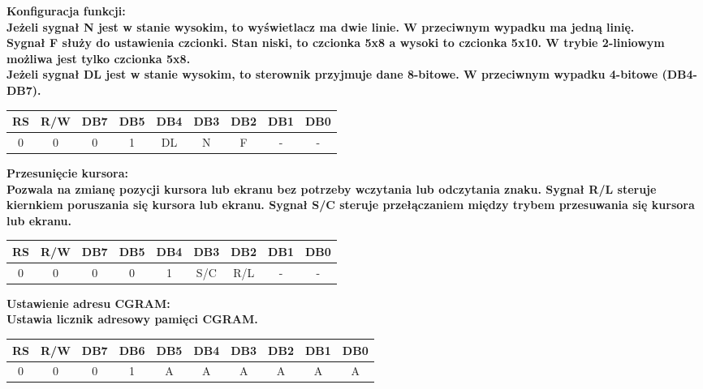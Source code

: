 \documentclass[a4paper,12pt]{article}
\newcommand{\h}[1]{\noindent \bf #1 \rm \\ \noindent}
\begin{document}
\h{Konfiguracja funkcji:}
Jeżeli sygnał N jest w stanie wysokim, to wyświetlacz ma dwie linie. W przeciwnym wypadku ma jedną linię.\\

\noindent
Sygnał F służy do ustawienia czcionki. Stan niski, to czcionka 5x8 a wysoki to czcionka 5x10. W trybie 2-liniowym możliwa jest tylko czcionka 5x8.\\

\noindent
Jeżeli sygnał DL jest w stanie wysokim, to sterownik przyjmuje dane 8-bitowe. W przeciwnym wypadku 4-bitowe (DB4-DB7).
\begin{table}[H]
	\centering
	\begin{tabular}{|c|c|c|c|c|c|c|c|c|}
		\hline
		\textbf{RS} & \textbf{R/W} & \textbf{DB7} & \textbf{DB5} & \textbf{DB4} & \textbf{DB3} & \textbf{DB2} & \textbf{DB1} & \textbf{DB0} \\ \hline
		0           & 0            & 0            & 1            & DL           & N            & F            & -            & -            \\ \hline
	\end{tabular}
\end{table}

\newpage
\h{Przesunięcie kursora:}
Pozwala na zmianę pozycji kursora lub ekranu bez potrzeby wczytania lub odczytania znaku. Sygnał R/L steruje kiernkiem poruszania się kursora lub ekranu. Sygnał S/C steruje przełączaniem między trybem przesuwania się kursora lub ekranu. 
\begin{table}[H]
	\centering
	\begin{tabular}{|c|c|c|c|c|c|c|c|c|}
		\hline
		\textbf{RS} & \textbf{R/W} & \textbf{DB7} & \textbf{DB5} & \textbf{DB4} & \textbf{DB3} & \textbf{DB2} & \textbf{DB1} & \textbf{DB0} \\ \hline
		0           & 0            & 0            & 0            & 1            & S/C          & R/L          & -            & -            \\ \hline
	\end{tabular}
\end{table}

\h{Ustawienie adresu CGRAM:}
Ustawia licznik adresowy pamięci CGRAM.
\begin{table}[H]
	\centering
	\begin{tabular}{|c|c|c|c|c|c|c|c|c|c|}
		\hline
		\textbf{RS} & \textbf{R/W} & \textbf{DB7} & \multicolumn{1}{c|}{\textbf{DB6}} & \textbf{DB5} & \textbf{DB4} & \textbf{DB3} & \textbf{DB2} & \textbf{DB1} & \textbf{DB0} \\ \hline
		0           & 0            & 0            & 1                                 & A            & A            & A            & A            & A            & A            \\ \hline
	\end{tabular}
\end{table}
\end{document}
